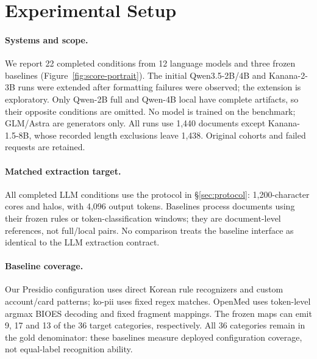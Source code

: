 \section{Experimental Setup}
\label{sec:setup}

\paragraph{Systems and scope.}
We report 22 completed conditions from 12 language models and three frozen baselines (Figure~\ref{fig:score-portrait}). The initial Qwen3.5-2B/4B and Kanana-2-3B runs were extended after formatting failures were observed; the extension is exploratory. Only Qwen-2B full and Qwen-4B local have complete artifacts, so their opposite conditions are omitted. No model is trained on the benchmark; GLM/Astra are generators only. All runs use 1,440 documents except Kanana-1.5-8B, whose recorded length exclusions leave 1,438. Original cohorts and failed requests are retained.

\paragraph{Matched extraction target.}
All completed LLM conditions use the protocol in \S\ref{sec:protocol}: 1,200-character cores and halos, with 4,096 output tokens. Baselines process documents using their frozen rules or token-classification windows; they are document-level references, not full/local pairs. No comparison treats the baseline interface as identical to the LLM extraction contract.

\paragraph{Baseline coverage.}
Our Presidio configuration uses direct Korean rule recognizers and custom account/card patterns; ko-pii uses fixed regex matches. OpenMed uses token-level argmax BIOES decoding and fixed fragment mappings. The frozen maps can emit 9, 17 and 13 of the 36 target categories, respectively. All 36 categories remain in the gold denominator: these baselines measure deployed configuration coverage, not equal-label recognition ability.

